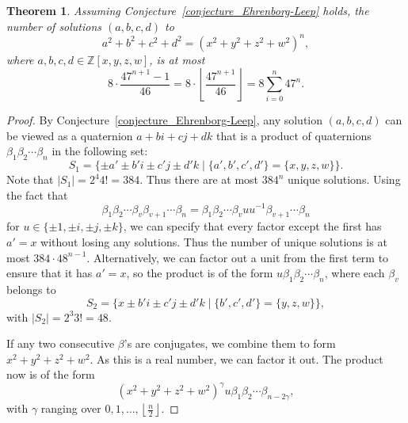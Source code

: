 \documentclass[12pt]{article}
\newtheorem{theorem}{Theorem}[section]
\theoremstyle{definition}
\theoremstyle{remark}
\newcommand{\Zzz}{\mathbb Z}
\numberwithin{equation}{section}
\begin{document}
\begin{theorem}
Assuming Conjecture~\ref{conjecture_Ehrenborg-Leep} holds,
the number of solutions \( (a, b, c, d) \) to
\[
a^2 + b^2 + c^2 + d^2 = (x^2 + y^2 + z^2 + w^2)^n,
\] 
where \( a, b, c, d \in \Zzz[x,y,z,w]\),
is at most
\[
8 \cdot \frac{47^{n+1} - 1}{46}
=  8 \cdot \left\lfloor \frac{ 47^{n+1} }{46} \right\rfloor
=  8 \sum_{i = 0}^n{47^n}.
\]
\end{theorem}
\begin{proof}
By Conjecture~\ref{conjecture_Ehrenborg-Leep}, any
solution
\( (a, b, c, d) \) can be viewed as a quaternion
\( a + bi + cj + dk \) that is a product of
quaternions \( \beta_1 \beta_2 \cdots \beta_n \) in the following set:
\[
S_1 = \{ \pm a' \pm b'i \pm c'j \pm d'k
\mid \{ a', b', c', d' \} = \{ x, y, z, w \} \}. 
\]
Note that \( | S_1 | = 2^4 4! = 384 \).
Thus there are at most \( 384^n \) unique solutions.
Using the fact that
\[
\beta_1 \beta_2 \cdots \beta_v \beta_{v+1} \cdots \beta_n
=
\beta_1 \beta_2 \cdots \beta_v u u^{-1} \beta_{v+1} \cdots \beta_n
\]
for \( u \in \{ \pm 1 , \pm i, \pm j, \pm k \} \), we can specify
that every factor except the first has \( a' = x \) without
losing any solutions. Thus the number of unique solutions is at most
\( 384 \cdot 48^{n-1} \). Alternatively, we can factor out a unit
from the first term to ensure that it has \( a' = x \), so the
product is of the form \( u \beta_1 \beta_2 \cdots \beta_n \),
where each \( \beta_v \) belongs to
\[
S_2 = \{ x \pm b'i \pm c'j \pm d'k
\mid \{ b', c', d' \} = \{ y, z, w \} \},
\]
with \( | S_2 | = 2^3 3! = 48 \).

If any two consecutive \( \beta \)'s are conjugates, we combine them
to form \( x^2 + y^2 + z^2 + w^2 \). As this is a real number, we can
factor it out. The product now is of the form
\[
(x^2 + y^2 + z^2 + w^2)^\gamma u \beta_1 \beta_2 \cdots \beta_{n-2\gamma},
\]
with \( \gamma \) ranging over \( 0, 1, \ldots, \left\lfloor \frac{n}{2} \right\rfloor \).


\end{proof}
\end{document}
